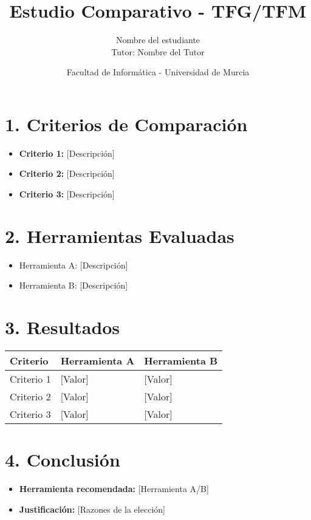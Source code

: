 \documentclass[12pt, a4paper]{article}
\title{\textbf{Estudio Comparativo - TFG/TFM}}
\author{Nombre del estudiante \\ Tutor: Nombre del Tutor}
\date{Facultad de Informática - Universidad de Murcia}
\begin{document}
\maketitle

\section*{1. Criterios de Comparación}
\begin{itemize}
    \item \textbf{Criterio 1:} [Descripción]
    \item \textbf{Criterio 2:} [Descripción]
    \item \textbf{Criterio 3:} [Descripción]
\end{itemize}

\section*{2. Herramientas Evaluadas}
\begin{itemize}
    \item Herramienta A: [Descripción]
    \item Herramienta B: [Descripción]
\end{itemize}

\section*{3. Resultados}
\begin{tabular}{|l|l|l|}
    \hline
    \textbf{Criterio} & \textbf{Herramienta A} & \textbf{Herramienta B} \\ \hline
    Criterio 1 & [Valor] & [Valor] \\ \hline
    Criterio 2 & [Valor] & [Valor] \\ \hline
    Criterio 3 & [Valor] & [Valor] \\ \hline
\end{tabular}

\section*{4. Conclusión}
\begin{itemize}
    \item \textbf{Herramienta recomendada:} [Herramienta A/B]
    \item \textbf{Justificación:} [Razones de la elección]
\end{itemize}
\end{document}
